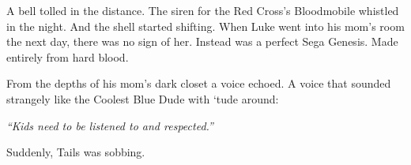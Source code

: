 A bell tolled in the distance. The siren for the Red Cross's
Bloodmobile whistled in the night. And the shell started shifting.
When Luke went into his mom's room the next day, there was no
sign of her. Instead was a perfect Sega Genesis. Made entirely from
hard blood.



From the depths of his mom's dark closet a voice echoed. A
voice that sounded strangely like the Coolest Blue Dude with
`tude around:



{\em ``Kids need to be listened to and
respected.''}



Suddenly, Tails was sobbing. 
 







